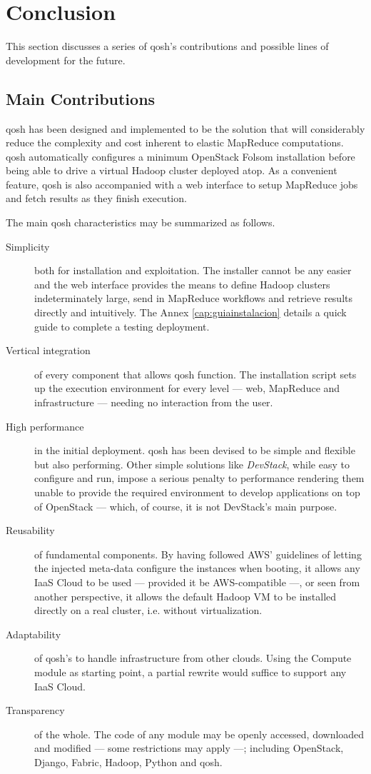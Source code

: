 \chapter*{Conclusion}\label{cap:aportaciones}
\noindent This section discusses a series of qosh's contributions and possible lines of development for the future.

\section*{Main Contributions}\label{sec:bondadesdeficiencias}
\noindent qosh has been designed and implemented to be the solution that will considerably reduce the complexity and cost inherent to elastic MapReduce computations. qosh automatically configures a minimum OpenStack Folsom installation before being able to drive a virtual Hadoop cluster deployed atop. As a convenient feature, qosh is also accompanied with a web interface to setup MapReduce jobs and fetch results as they finish execution.

The main qosh characteristics may be summarized as follows.

\begin{description}
    \item[Simplicity] both for installation and exploitation. The installer cannot be any easier and the web interface provides the means to define Hadoop clusters indeterminately large, send in MapReduce workflows and retrieve results directly and intuitively. The Annex \ref{cap:guiainstalacion} details a quick guide to complete a testing deployment.
    \item[Vertical integration] of every component that allows qosh function. The installation script sets up the execution environment for every level --- web, MapReduce and infrastructure --- needing no interaction from the user.
    \item[High performance] in the initial deployment. qosh has been devised to be simple and flexible but also performing. Other simple solutions like \emph{DevStack}, while easy to configure and run, impose a serious penalty to performance rendering them unable to provide the required environment to develop applications on top of OpenStack --- which, of course, it is not DevStack's main purpose.
    \item[Reusability] of fundamental components. By having followed AWS' guidelines of letting the injected meta-data configure the instances when booting, it allows any IaaS Cloud to be used --- provided it be AWS-compatible ---, or seen from another perspective, it allows the default Hadoop VM to be installed directly on a real cluster, i.e. without virtualization.
    \item[Adaptability] of qosh's to handle infrastructure from other clouds. Using the Compute module as starting point, a partial rewrite would suffice to support any IaaS Cloud.
    \item[Transparency] of the whole. The code of any module may be openly accessed, downloaded and modified --- some restrictions may apply ---; including OpenStack, Django, Fabric, Hadoop, Python and qosh.
\end{description}

